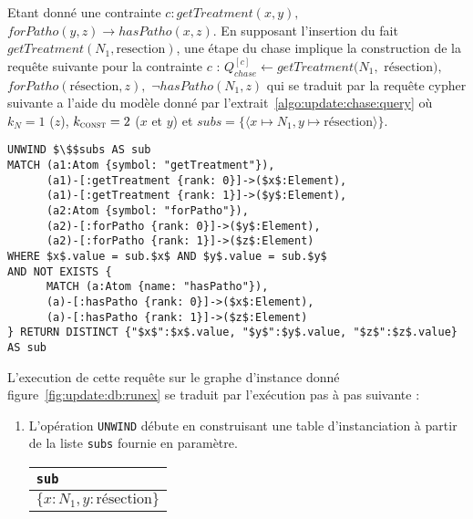 \begin{example}
    \label{ex:update:chase:query}
    Etant donné une contrainte $c : getTreatment(x, y),$ $forPatho(y, z) \to hasPatho(x, z)$.
    En supposant l'insertion du fait $getTreatment(N_1, \text{resection})$, une étape du chase implique la construction de la requête suivante pour la contrainte $c$ : $Q_{chase}^{[c]} \gets getTreatment(N_1,$ $\text{résection}),$ $forPatho(\text{résection}, z),$ $\lnot hasPatho(N_1, z)$ qui se traduit par la requête \gls{cypher} suivante a l'aide du modèle donné par l'extrait~\ref{algo:update:chase:query} où $k_N = 1$ ($z$), $k_{\textsc{const}} = 2$ ($x$ et $y$) et $subs = \{\langle x \mapsto N_1, y \mapsto \text{résection} \rangle\}$.

    \begin{lstlisting}[mathescape, language=cypher]
UNWIND $\$$subs AS sub
MATCH (a1:Atom {symbol: "getTreatment"}),
      (a1)-[:getTreatment {rank: 0}]->($x$:Element),
      (a1)-[:getTreatment {rank: 1}]->($y$:Element),
      (a2:Atom {symbol: "forPatho"}),
      (a2)-[:forPatho {rank: 0}]->($y$:Element),
      (a2)-[:forPatho {rank: 1}]->($z$:Element)
WHERE $x$.value = sub.$x$ AND $y$.value = sub.$y$
AND NOT EXISTS {
      MATCH (a:Atom {name: "hasPatho"}),
      (a)-[:hasPatho {rank: 0}]->($x$:Element),
      (a)-[:hasPatho {rank: 1}]->($z$:Element)
} RETURN DISTINCT {"$x$":$x$.value, "$y$":$y$.value, "$z$":$z$.value} AS sub
\end{lstlisting}

    L'execution de cette requête sur le graphe d'instance donné figure~\ref{fig:update:db:runex} se traduit par l'exécution pas à pas suivante :
    \begin{enumerate}[label=\emph{Etape~\arabic*},leftmargin=*]
        \item L'opération \verb|UNWIND| débute en construisant une table d'instanciation à partir de la liste \verb|subs| fournie en paramètre.
              \begin{center}
                  \begin{tabular}{l}
                      \hline
                      \verb|sub|                        \\
                      \hline
                      $\{x: N_1, y: \text{résection}\}$ \\
                      \hline
                  \end{tabular}
              \end{center}


\end{enumerate}
\end{example}
